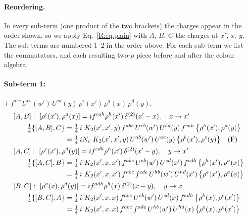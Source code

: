 \documentclass[10pt]{article}
\numberwithin{equation}{section}
\begin{document}
\paragraph{Reordering.} In every sub-term (one product of the two brackets) the charges appear in the order shown, so we apply Eq.~\eqref{R:eq:plain} with $A$, $B$, $C$ the charges at $x'$, $x$, $y$. The sub-terms are numbered 1--2 in the order above. For each sub-term we list the commutators, and each resulting two-$\rho$ piece before and after the colour algebra.
\paragraph{Sub-term 1:} $+\,f^{abc}\,U^{eb}(w')\,U^{ed}(y)\,\rho^{c}(x')\,\rho^{a}(x)\,\rho^{d}(y)$.
\begin{align}
&[A,B]:\ [\rho^{c}(x'),\rho^{a}(x)]=i f^{cah}\rho^{h}(x')\,\delta^{(2)}(x'-x),\quad x\to x'\notag\\
&\qquad \tfrac14\{[A,B],C\}=\tfrac14\,i\,\,K_2(x',x',y)\,f^{abc}\,U^{eb}(w')\,U^{ed}(y)\,f^{cah}\,\big\{\rho^{h}(x'),\rho^{d}(y)\big\}\notag\\
&\qquad\phantom{\tfrac14\{[A,B],C\}}=\tfrac14\,i N_{c}\,\,K_2(x',x',y)\,U^{ab}(w')\,U^{ac}(y)\,\big\{\rho^{b}(x'),\rho^{c}(y)\big\}\quad\text{(F)}
\label{R:eq:A2-1-AB}\\
&[A,C]:\ [\rho^{c}(x'),\rho^{d}(y)]=i f^{cdh}\rho^{h}(x')\,\delta^{(2)}(x'-y),\quad y\to x'\notag\\
&\qquad \tfrac14\{[A,C],B\}=\tfrac14\,i\,\,K_2(x',x,x')\,f^{abc}\,U^{eb}(w')\,U^{ed}(x')\,f^{cdh}\,\big\{\rho^{h}(x'),\rho^{a}(x)\big\}\notag\\
&\qquad\phantom{\tfrac14\{[A,C],B\}}=\tfrac14\,i\,\,K_2(x',x,x')\,f^{abc}\,f^{cde}\,U^{hb}(w')\,U^{hd}(x')\,\big\{\rho^{e}(x'),\rho^{a}(x)\big\}
\label{R:eq:A2-1-AC}\\
&[B,C]:\ [\rho^{a}(x),\rho^{d}(y)]=i f^{adh}\rho^{h}(x)\,\delta^{(2)}(x-y),\quad y\to x\notag\\
&\qquad \tfrac14\{[B,C],A\}=\tfrac14\,i\,\,K_2(x',x,x)\,f^{abc}\,U^{eb}(w')\,U^{ed}(x)\,f^{adh}\,\big\{\rho^{h}(x),\rho^{c}(x')\big\}\notag\\
&\qquad\phantom{\tfrac14\{[B,C],A\}}=\tfrac14\,i\,\,K_2(x',x,x)\,f^{abc}\,f^{ade}\,U^{hb}(w')\,U^{hd}(x)\,\big\{\rho^{e}(x),\rho^{c}(x')\big\}
\label{R:eq:A2-1-BC}
\end{align}
\end{document}
